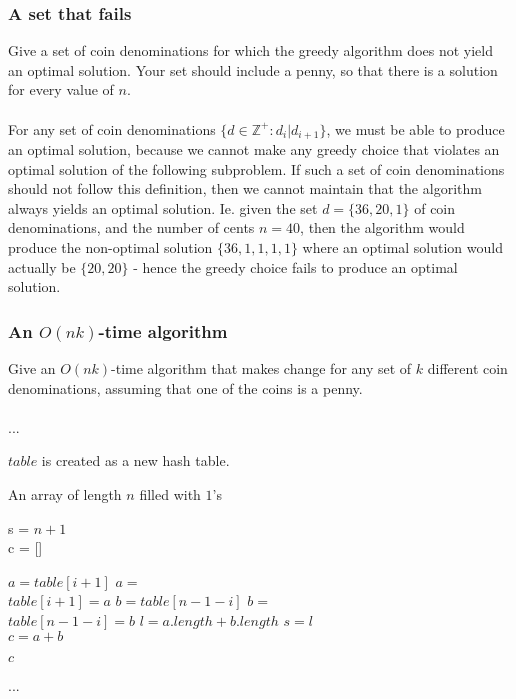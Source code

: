 \documentclass[11pt,english]{article}
\begin{document}
\subsubsection*{A set that fails}
\large{Give a set of coin denominations for which the greedy algorithm
does not yield an optimal solution. Your set should include a penny, so
that there is a solution for every value of $n$.}
\\\\
For any set of coin denominations
$\{d \in \mathbb{Z}^{+} : d_i | d_{i+1}\}$, we must be able to produce an
optimal solution, because we cannot make any greedy choice that violates an
optimal solution of the following subproblem. If such a set of coin
denominations should not follow this definition, then we cannot maintain
that the algorithm always yields an optimal solution. Ie. given the set
$d = \{36, 20, 1\}$ of coin denominations, and the number of cents $n = 40$,
then the algorithm would produce the non-optimal solution $\{36, 1, 1, 1, 1\}$
where an optimal solution would actually be $\{20, 20\}$ - hence the greedy
choice fails to produce an optimal solution.

\subsubsection*{An $O(nk)$-time algorithm}
\large{Give an $O(nk)$-time algorithm that makes change for any set of $k$
different coin denominations, assuming that one of the coins is a penny.}
\\\\
...
\begin{algorithm}

	\BlankLine
	
	{
		$table$ is created as a new hash table.
	}

	{
		\Return An array of length $n$ filled with $1$'s
	}
	{
		\Return [$n$]
	}
	\Else
	{
		s = $n + 1$\\
		c = []
		
		{
			{
				$a = table[i+1]$
			}
			{
				$a = $ \\
				$table[i+1] = a$
			}
			{
				$b = table[n - 1 - i]$
			}
			{
				$b = $ \\
				$table[n - 1 - i] = b$
			}
			$l = a.length + b.length$
			{
				$s = l$\\
				$c = a + b$
			}
		}
	}
	\Return $c$
\end{algorithm}
...
\end{document}

